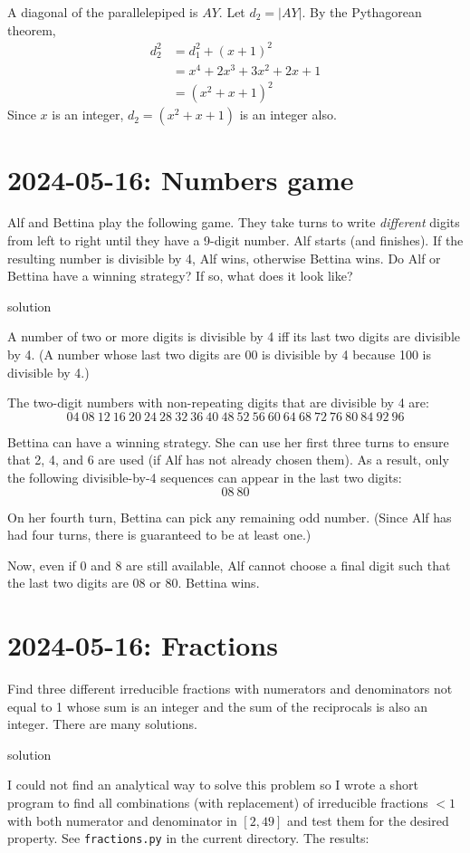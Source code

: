 \documentclass[11pt, oneside]{amsart}
\newcommand{\problem}[2]{\section*{#1: #2}}
\newcommand{\solution}[0]{{\sc solution}}
\begin{document}
A diagonal of the parallelepiped is $AY$. Let $d_2 = |AY|$.
By the Pythagorean theorem,
\begin{align*}
	 d_2^2 &= d_1^2 + (x+1)^2 \\
           &= x^4 + 2x^3 + 3x^2 + 2x + 1 \\
           &= (x^2 + x + 1)^2
\end{align*}
Since $x$ is an integer, $d_2 = (x^2 + x +1)$ is an integer also.

\newpage
\problem{2024-05-16}{Numbers game}

Alf and Bettina play the following game. They take turns to write {\em different} digits
from left to right until they have a 9-digit number. Alf starts (and finishes). If the resulting number is divisible by 4, Alf wins, otherwise Bettina wins.
Do Alf or Bettina have a winning strategy? If so, what does it look like?

\solution

A number of two or more digits is divisible by 4 iff its last two digits
are divisible by 4. (A number whose last two digits are $00$ is divisible by
4 because 100 is divisible by 4.)

The two-digit numbers with non-repeating digits that are divisible by 4 are:
\[ 04~08~12~16~20~24~28~32~36~40~48~52~56~60~64~68~72~76~80~84~92~96 \]

Bettina can have a winning strategy. She can use her first three turns
to ensure that 2, 4, and 6 are used (if Alf has not already chosen
them). As a result, only the following divisible-by-4 sequences can appear
in the last two digits:
\[ 08~80 \]

On her fourth turn, Bettina can pick any remaining odd number. (Since Alf
has had four turns, there is guaranteed to be at least one.)

Now, even if 0 and 8 are still available, Alf cannot choose a final digit
such that the last two digits are 08 or 80. Bettina wins.

\newpage
\problem{2024-05-16}{Fractions}

Find three different irreducible fractions with numerators and denominators
not equal to 1 whose sum is an integer and the sum of the reciprocals is
also an integer. There are many solutions.

\solution

I could not find an analytical way to solve this problem so I wrote a short program
to find all combinations (with replacement) of irreducible fractions $<1$ with both numerator
and denominator in $[2, 49]$ and test them for the desired property. See {\tt fractions.py}
in the current directory. The results:
\end{document}
